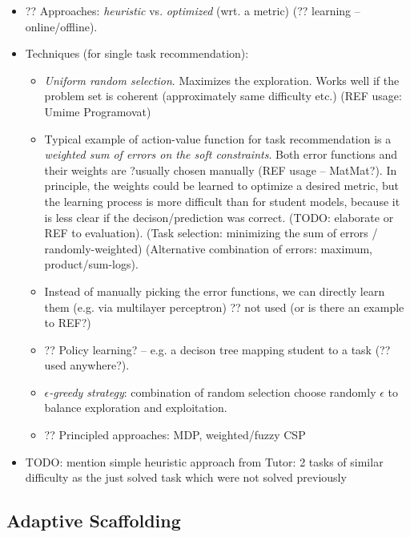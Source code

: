 \begin{itemize}
\item ?? Approaches: \emph{heuristic} vs. \emph{optimized} (wrt. a metric)
  (?? learning -- online/offline).
\item Techniques (for single task recommendation):
\begin{itemize}
\item \emph{Uniform random selection}. Maximizes the exploration.
  Works well if the problem set is coherent (approximately same difficulty etc.)
  (REF usage: Umime Programovat)
\item Typical example of action-value function for task recommendation is
  a \emph{weighted sum of errors on the soft constraints}.
  Both error functions and their weights are ?usually chosen manually
  (REF usage -- MatMat?).
  In principle, the weights could be learned to optimize a desired metric, but the
  learning process is more difficult than for student models,
  because it is less clear if the decison/prediction was correct.
  (TODO: elaborate or REF to evaluation).
  (Task selection: minimizing the sum of errors / randomly-weighted)
  (Alternative combination of errors: maximum, product/sum-logs).
\item Instead of manually picking the error functions, we can directly learn
  them (e.g. via multilayer perceptron) %
  ?? not used (or is there an example to REF?)
\item ?? Policy learning? -- e.g. a decison tree mapping student to a task
  (?? used anywhere?).
\item \emph{$\epsilon$-greedy strategy}: combination of random selection choose randomly $\epsilon$
  to balance exploration and exploitation.
\item ?? Principled approaches: MDP, weighted/fuzzy CSP
\end{itemize}
\item TODO: mention simple heuristic approach from Tutor: 2 tasks of similar difficulty as the just solved task which were not solved previously
\end{itemize}


\subsection{Adaptive Scaffolding}


